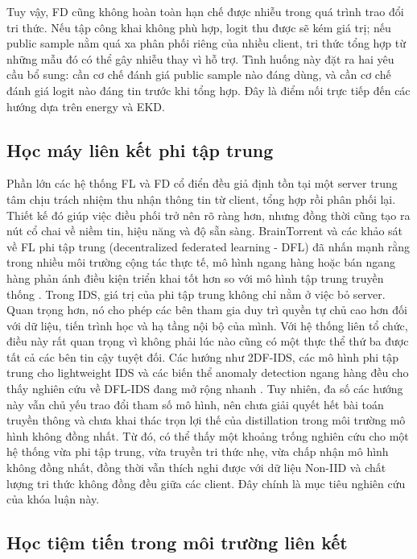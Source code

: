 \bigbreak\noindent
Tuy vậy, FD cũng không hoàn toàn hạn chế được nhiễu trong quá trình trao đổi tri thức. Nếu tập công khai không phù hợp, logit thu được sẽ kém giá trị; nếu public sample nằm quá xa phân phối riêng của nhiều client, tri thức tổng hợp từ những mẫu đó có thể gây nhiễu thay vì hỗ trợ. Tình huống này đặt ra hai yêu cầu bổ sung: cần cơ chế đánh giá public sample nào đáng dùng, và cần cơ chế đánh giá logit nào đáng tin trước khi tổng hợp. Đây là điểm nối trực tiếp đến các hướng dựa trên energy và EKD.

\subsection{Học máy liên kết phi tập trung}

Phần lớn các hệ thống FL và FD cổ điển đều giả định tồn tại một server trung tâm chịu trách nhiệm thu nhận thông tin từ client, tổng hợp rồi phân phối lại. Thiết kế đó giúp việc điều phối trở nên rõ ràng hơn, nhưng đồng thời cũng tạo ra nút cổ chai về niềm tin, hiệu năng và độ sẵn sàng. BrainTorrent và các khảo sát về FL phi tập trung (decentralized federated learning - DFL) đã nhấn mạnh rằng trong nhiều môi trường cộng tác thực tế, mô hình ngang hàng hoặc bán ngang hàng phản ánh điều kiện triển khai tốt hơn so với mô hình tập trung truyền thống \cite{braintorrent,beltran2023dflsurvey}.
\bigbreak\noindent
Trong IDS, giá trị của phi tập trung không chỉ nằm ở việc bỏ server. Quan trọng hơn, nó cho phép các bên tham gia duy trì quyền tự chủ cao hơn đối với dữ liệu, tiến trình học và hạ tầng nội bộ của mình. Với hệ thống liên tổ chức, điều này rất quan trọng vì không phải lúc nào cũng có một thực thể thứ ba được tất cả các bên tin cậy tuyệt đối. Các hướng như 2DF-IDS, các mô hình phi tập trung cho lightweight IDS và các biến thể anomaly detection ngang hàng đều cho thấy nghiên cứu về DFL-IDS đang mở rộng nhanh \cite{friha20232dfl-ids,nakip2023dfl-ids,attanayaka2023dfl-anomaly}. Tuy nhiên, đa số các hướng này vẫn chủ yếu trao đổi tham số mô hình, nên chưa giải quyết hết bài toán truyền thông và chưa khai thác trọn lợi thế của distillation trong môi trường mô hình không đồng nhất.
\bigbreak\noindent
Từ đó, có thể thấy một khoảng trống nghiên cứu cho một hệ thống vừa phi tập trung, vừa truyền tri thức nhẹ, vừa chấp nhận mô hình không đồng nhất, đồng thời vẫn thích nghi được với dữ liệu Non-IID và chất lượng tri thức không đồng đều giữa các client. Đây chính là mục tiêu nghiên cứu của khóa luận này.

\subsection{Học tiệm tiến trong môi trường liên kết}


